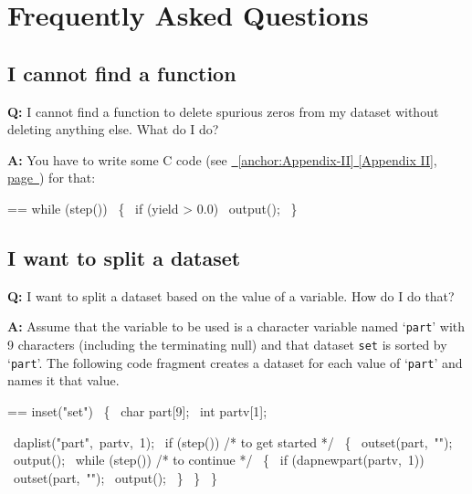 \documentclass{book}
\makeatletter
\newenvironment{Texinfopreformatted}{%
  \par\GNUTobeylines\obeyspaces\frenchspacing\parskip=\z@\parindent=\z@}{}
{\catcode`\^^M=13 \gdef\GNUTobeylines{\catcode`\^^M=13 \def^^M{\null\par}}}
\newenvironment{Texinfoindented}{\begin{list}{}{}\item\relax}{\end{list}}
\renewcommand{\_}{\Texinfounderscore\discretionary{}{}{}}
\makeatother
\begin{document}
\chapter*{{Frequently Asked Questions}}
\label{anchor:FAQ}%


\section{{I cannot find a function}}
\label{anchor:I-cannot-find-a-function}%

\textbf{Q:} I cannot find a function to delete spurious zeros from my
dataset without deleting anything else. What do I do?

\textbf{A:} You have to write some C code (see \hyperref[anchor:Appendix-II]{\chaptername~\ref*{anchor:Appendix-II} [Appendix II], page~\pageref*{anchor:Appendix-II}}) for that:
\begin{Texinfoindented}
\begin{Texinfopreformatted}%
\ttfamily while (step())
\  \{
\    if (yield > 0.0)
\      output();
\  \}
\end{Texinfopreformatted}
\end{Texinfoindented}

\section{{I want to split a dataset}}
\label{anchor:I-want-to-split-a-dataset}%

\textbf{Q:} I want to split a dataset based on the value of a
variable. How do I do that?

\textbf{A:} Assume that the variable to be used is a
character variable named `\texttt{part}' with 9 characters
(including the terminating null) and that dataset
\texttt{set} is sorted by `\texttt{part}'.
The following code fragment creates a dataset for each
value of `\texttt{part}' and names it that value.

\begin{Texinfoindented}
\begin{Texinfopreformatted}%
\ttfamily inset("set")
\  \{
\    char part[9];
\    int partv[1];

\    daplist("part",\ partv,\ 1);
\    if (step())  /* to get started */
\      \{
\        outset(part,\ "");
\        output();
\        while (step())  /* to continue */
\          \{
\            if (dap\_newpart(partv,\ 1))
\              outset(part,\ "");
\            output();
\          \}
\      \}
\  \}
\end{Texinfopreformatted}
\end{Texinfoindented}
\end{document}

